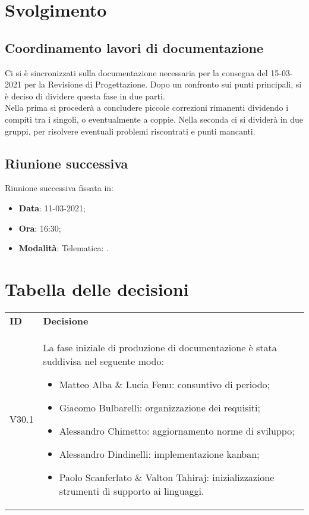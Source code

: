 \documentclass[]{article}
\begin{document}
	\newpage

	\section{Svolgimento}
		\subsection{Coordinamento lavori di documentazione}
		Ci si è sincronizzati sulla documentazione necessaria per la consegna del 15-03-2021 per la Revisione di Progettazione. Dopo un confronto sui punti principali, si è deciso di dividere questa fase in due parti.\\
		Nella prima si procederà a concludere piccole correzioni rimanenti dividendo i compiti tra i singoli, o eventualmente a coppie. Nella seconda ci si dividerà in due gruppi, per risolvere eventuali problemi riscontrati e punti mancanti.\\


	\subsection{Riunione successiva}
	Riunione successiva fissata in:
	\begin{itemize}
		\item \textbf{Data}: 11-03-2021;
		\item \textbf{Ora}: 16:30;
		\item \textbf{Modalità}: Telematica: .
	\end{itemize}

	\newpage

	\section{Tabella delle decisioni}

	\begin{table} [h!]
		\begin{center}
			\begin{tabular} { m{2cm} m{14cm} }
				\rowcolor{lightgray}
				\textbf{ID} & \textbf{Decisione}\\
				V30.1 & La fase iniziale di produzione di documentazione è stata suddivisa nel seguente modo:
				 \begin{itemize}
					\item Matteo Alba \& Lucia Fenu: consuntivo di periodo;
					\item Giacomo Bulbarelli: organizzazione dei requisiti;
					\item Alessandro Chimetto: aggiornamento norme di sviluppo;
					\item Alessandro Dindinelli: implementazione kanban;
					\item Paolo Scanferlato \& Valton Tahiraj: inizializzazione strumenti di supporto ai linguaggi.
				\end{itemize}\\
			\end{tabular}
		\end{center}
	\end{table}
\end{document}
